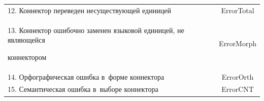 \begin{table}
\begin{center}
\begin{tabular}{|l|c|}
12. Коннектор переведен несуществующей единицей&ErrorTotal\\ 


13. Коннектор ошибочно заменен языковой единицей, не являющейся 


коннектором&ErrorMorph\\ 


14. Орфографическая ошибка в~форме коннектора&ErrorOrth\\ 


15. Семантическая ошибка в~выборе коннектора&ErrorCNT\\ 


\hline 


\end{tabular} 


\end{center} 


\end{table}





